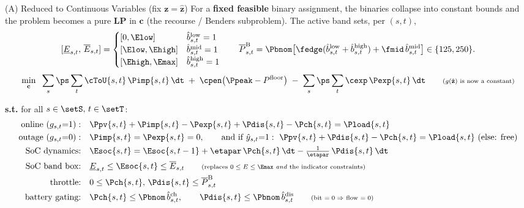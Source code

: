\begin{frame}{(A) Reduced to Continuous Variables (fix $\mathbf z=\hat{\mathbf z}$)}
For a \textbf{fixed feasible} binary assignment, the binaries collapse into constant bounds and the problem becomes a pure \textbf{LP} in $\mathbf c$ (the recourse / Benders subproblem). The active band sets, per $(s,t)$,
\[
[\underline E_{s,t},\,\overline E_{s,t}]=
\begin{cases}
[0,\Elow] & \hat b^{\text{low}}_{s,t}=1\\
[\Elow,\Ehigh] & \hat b^{\text{mid}}_{s,t}=1\\
[\Ehigh,\Emax] & \hat b^{\text{high}}_{s,t}=1
\end{cases}
\qquad
\overline P^{\text{B}}_{s,t}=\Pbnom\bigl[\fedge(\hat b^{\text{low}}_{s,t}+\hat b^{\text{high}}_{s,t})+\fmid\,\hat b^{\text{mid}}_{s,t}\bigr]\in\{125,250\}.
\]
\[
\min_{\mathbf c}\;\;
\sum_{s}\ps\sum_{t}\cToU{s,t}\,\Pimp{s,t}\,\dt
\;+\;\cpen\bigl(\Ppeak-P^{\text{floor}}\bigr)
\;-\;\sum_{s}\ps\sum_{t}\cexp\,\Pexp{s,t}\,\dt
\qquad\text{\scriptsize($g(\hat{\mathbf z})$ is now a constant)}
\]
\vspace{-0.4em}
\begin{block}{}
\scriptsize
\textbf{s.t.} for all $s\in\setS,\,t\in\setT$:
\begin{align*}
\text{online }(g_{s,t}{=}1):\quad & \Ppv{s,t}+\Pimp{s,t}-\Pexp{s,t}+\Pdis{s,t}-\Pch{s,t}=\Pload{s,t}\\
\text{outage }(g_{s,t}{=}0):\quad & \Pimp{s,t}=\Pexp{s,t}=0,\qquad
   \text{and if }\hat y_{s,t}{=}1:\ \Ppv{s,t}+\Pdis{s,t}-\Pch{s,t}=\Pload{s,t}\ \text{(else: free)}\\
\text{SoC dynamics:}\quad & \Esoc{s,t}=\Esoc{s,t-1}+\etapar\,\Pch{s,t}\,\dt-\tfrac{1}{\etapar}\,\Pdis{s,t}\,\dt\\
\text{SoC band box:}\quad & \underline E_{s,t}\le \Esoc{s,t}\le \overline E_{s,t}
   \qquad\text{\scriptsize(replaces $0\le E\le\Emax$ \emph{and} the indicator constraints)}\\
\text{throttle:}\quad & 0\le \Pch{s,t},\,\Pdis{s,t}\le \overline P^{\text{B}}_{s,t}\\
\text{battery gating:}\quad & \Pch{s,t}\le \Pbnom\,\hat b^{\text{ch}}_{s,t},\qquad \Pdis{s,t}\le \Pbnom\,\hat b^{\text{dis}}_{s,t}
   \qquad\text{\scriptsize(bit $=0\Rightarrow$ flow $=0$)}\\

\end{align*}
\end{block}
\end{frame}
